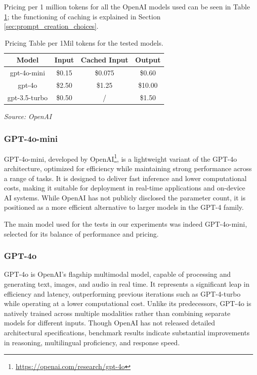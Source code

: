 Pricing per 1 million tokens for all the OpenAI models used can be seen in Table
\ref{tab:pricing}; the functioning of caching is explained in Section
\ref{sec:prompt_creation_choices}.

\vspace{3mm}
\begin{table}[h]
  \centering
  \renewcommand{\arraystretch}{1.5}
  \setlength{\tabcolsep}{8pt}
  \begin{tabular}{ c c c c }
    \textbf{Model} & \textbf{Input} & \textbf{Cached Input} & \textbf{Output} \\
    \hline
    gpt-4o-mini    & \$0.15         & \$0.075               & \$0.60          \\
    gpt-4o         & \$2.50         & \$1.25                & \$10.00         \\
    gpt-3.5-turbo  & \$0.50         & /                     & \$1.50          \\
  \end{tabular}
  \caption{Pricing Table per 1Mil tokens for the tested models.}
  {\emph{Source: OpenAI \footnotemark}} \label{tab:pricing}
\end{table}
\vspace{3mm}

\subsubsection{GPT-4o-mini}
GPT-4o-mini, developed by OpenAI\footnote{\url{https://openai.com/research/gpt-4o}},
is a lightweight variant of the GPT-4o architecture, optimized for efficiency while
maintaining strong performance across a range of tasks. It is designed to
deliver fast inference and lower computational costs, making it suitable for deployment
in real-time applications and on-device AI systems. While OpenAI has not
publicly disclosed the parameter count, it is positioned as a more efficient alternative
to larger models in the GPT-4 family.

The main model used for the tests in our experiments was indeed GPT-4o-mini,
selected for its balance of performance and pricing.

\subsubsection{GPT-4o}
GPT-4o is OpenAI's flagship multimodal model, capable of processing and generating
text, images, and audio in real time. It represents a significant leap in
efficiency and latency, outperforming previous iterations such as GPT-4-turbo while
operating at a lower computational cost. Unlike its predecessors, GPT-4o is natively
trained across multiple modalities rather than combining separate models for different
inputs. Though OpenAI has not released detailed architectural specifications, benchmark
results indicate substantial improvements in reasoning, multilingual proficiency,
and response speed.

